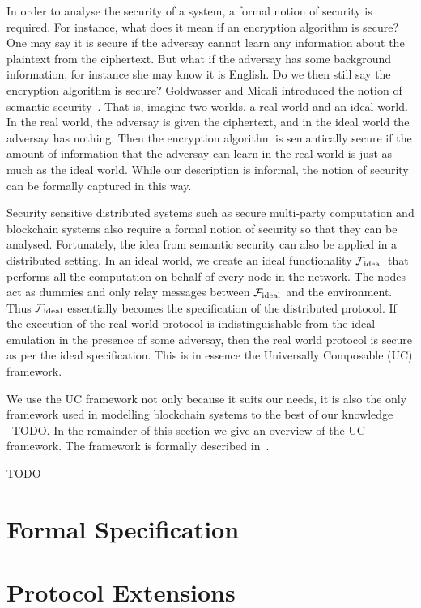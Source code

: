 In order to analyse the security of a system, a formal notion of security is required.
For instance, what does it mean if an encryption algorithm is secure?
One may say it is secure if the adversay cannot learn any information about the plaintext from the ciphertext.
But what if the adversay has some background information, for instance she may know it is English.
Do we then still say the encryption algorithm is secure?
Goldwasser and Micali introduced the notion of semantic security~\cite{goldwasser1982probabilistic}.
That is, imagine two worlds, a real world and an ideal world.
In the real world, the adversay is given the ciphertext,
and in the ideal world the adversay has nothing.
Then the encryption algorithm is semantically secure if the amount of information that the adversay can learn in the real world is just as much as the ideal world.
While our description is informal, the notion of security can be formally captured in this way.

Security sensitive distributed systems such as secure multi-party computation and blockchain systems also require a formal notion of security so that they can be analysed.
Fortunately, the idea from semantic security can also be applied in a distributed setting.
In an ideal world, we create an ideal functionality $\mathcal{F}_{\text{ideal}}$ that performs all the computation on behalf of every node in the network.
The nodes act as dummies and only relay messages between $\mathcal{F}_{\text{ideal}}$ and the environment.
Thus $\mathcal{F}_{\text{ideal}}$ essentially becomes the specification of the distributed protocol.
If the execution of the real world protocol is indistinguishable from the ideal emulation in the presence of some adversay,
then the real world protocol is secure as per the ideal specification.
This is in essence the Universally Composable (UC) framework.

We use the UC framework not only because it suits our needs, it is also the only framework used in modelling blockchain systems to the best of our knowledge
~\cite{todo}TODO.
In the remainder of this section we give an overview of the UC framework.
The framework is formally described in~\cite{canetti2001universally}.

TODO

\section{Formal Specification}
\label{sec:formal-model}

\section{Protocol Extensions}
\label{sec:protocol-extensions}

